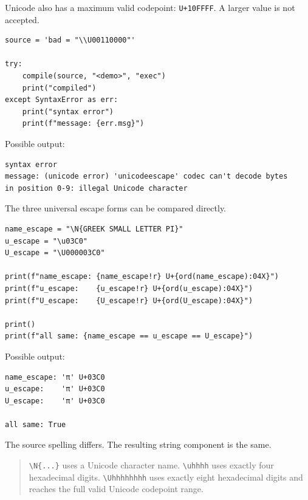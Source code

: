 Unicode also has a maximum valid codepoint: \texttt{U+10FFFF}. A larger value is not accepted.

\begin{verbatim}
source = 'bad = "\\U00110000"'

try:
    compile(source, "<demo>", "exec")
    print("compiled")
except SyntaxError as err:
    print("syntax error")
    print(f"message: {err.msg}")
\end{verbatim}

Possible output:

\begin{verbatim}
syntax error
message: (unicode error) 'unicodeescape' codec can't decode bytes
in position 0-9: illegal Unicode character
\end{verbatim}

The three universal escape forms can be compared directly.

\begin{verbatim}
name_escape = "\N{GREEK SMALL LETTER PI}"
u_escape = "\u03C0"
U_escape = "\U000003C0"

print(f"name_escape: {name_escape!r} U+{ord(name_escape):04X}")
print(f"u_escape:    {u_escape!r} U+{ord(u_escape):04X}")
print(f"U_escape:    {U_escape!r} U+{ord(U_escape):04X}")

print()
print(f"all same: {name_escape == u_escape == U_escape}")
\end{verbatim}

Possible output:

\begin{verbatim}
name_escape: 'π' U+03C0
u_escape:    'π' U+03C0
U_escape:    'π' U+03C0

all same: True
\end{verbatim}

The source spelling differs. The resulting string component is the same.

\begin{quote}
\texttt{\textbackslash N\{...\}} uses a Unicode character name.  
\texttt{\textbackslash uhhhh} uses exactly four hexadecimal digits.  
\texttt{\textbackslash Uhhhhhhhh} uses exactly eight hexadecimal digits and reaches the full valid Unicode codepoint range.
\end{quote}